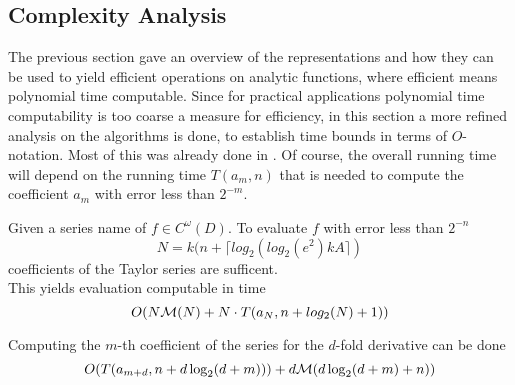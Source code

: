 	\subsection{Complexity Analysis}
		The previous section gave an overview of the representations and how they can be used to yield efficient 
		operations on analytic functions, where efficient means polynomial time computable.
		Since for practical applications polynomial time computability is too coarse a measure for efficiency, 
		in this section a more refined analysis on the algorithms is done, to establish time bounds in terms of $O$-notation.
		Most of this was already done in \cite{mypaper}.
		Of course, the overall running time will depend on the running time $T(a_m, n)$ that is needed to 
		compute the coefficient $a_m$ with error less than $2^{-m}$.
		\begin{theorem}
			Given a series name of $f \in C^\omega(D)$.
			To evaluate $f$ with error less than $2^{-n}$ 
			$$N = k(n+\lceil log_2(log_2 (e^2) kA \rceil)$$
			coefficients of the Taylor series are sufficent. \\
			This yields evaluation computable in time 
			$$ O(N\mathcal M(N)+N \cdot T(a_N, n+log_2(N)+1)) $$ 
		\end{theorem}

		\begin{theorem}
			Computing the $m$-th coefficient of the series for the $d$-fold derivative can be done
			$$ O(T(a_{m+d}, n+d\log_2(d+m)))+d\mathcal M(d \log_2 (d+m)+n)) $$
		\end{theorem}

